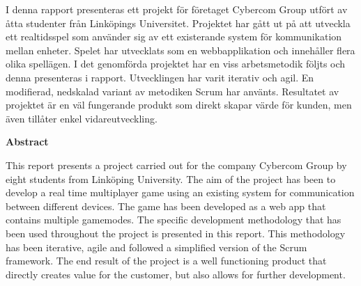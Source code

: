 {\justify
I denna rapport presenteras ett projekt för företaget Cybercom Group utfört av åtta studenter från Linköpings Universitet. Projektet har gått ut på att utveckla ett realtidsspel som använder sig av ett existerande system för kommunikation mellan enheter. Spelet har utvecklats som en webbapplikation och innehåller flera olika spellägen. I det genomförda projektet har en viss arbetsmetodik följts och denna presenteras i rapport. Utvecklingen har varit iterativ och agil. En modifierad, nedskalad variant av metodiken Scrum har använts. Resultatet av projektet är en väl fungerande produkt som direkt skapar värde för kunden, men även tillåter enkel vidareutveckling.\\[1in]\par
}
{\centering
  \indent\textbf{Abstract}\par
}
This report presents a project carried out for the company Cybercom Group by eight students from Linköping University. The aim of the project has been to develop a real time multiplayer game using an existing system for communication between different devices. The game has been developed as a web app that contains multiple gamemodes. The specific development methodology that has been used throughout the project is presented in this report. This methodology has been iterative, agile and followed a simplified version of the Scrum framework. The end result of the project is a well functioning product that directly creates value for the customer, but also allows for further development.
